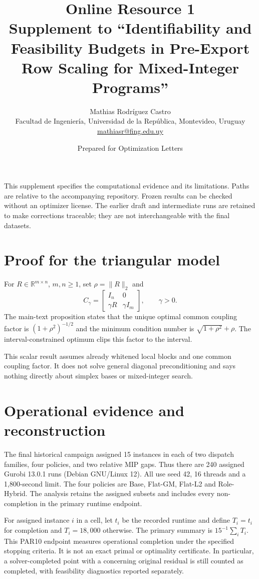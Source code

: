 \documentclass[11pt]{article}
\title{Online Resource 1\\\large Supplement to ``Identifiability and Feasibility Budgets in Pre-Export Row Scaling for Mixed-Integer Programs''}
\author{Mathias Rodr\'iguez Castro\\\small Facultad de Ingenier\'ia, Universidad de la Rep\'ublica, Montevideo, Uruguay\\\small\href{mailto:mathiasr@fing.edu.uy}{mathiasr@fing.edu.uy}}
\date{Prepared for Optimization Letters}
\begin{document}
\maketitle
This supplement specifies the computational evidence and its limitations. Paths are
relative to the accompanying repository. Frozen results can be checked without an
optimizer license. The earlier draft and intermediate runs are retained to make
corrections traceable; they are not interchangeable with the final datasets.

\section{Proof for the triangular model}
For $R\in\mathbb R^{m\times n}$, $m,n\ge1$, set $\rho=\|R\|_2$ and
\[
 C_\gamma=\begin{bmatrix}I_n&0\\\gamma R&\gamma I_m\end{bmatrix},\qquad \gamma>0.
\]
The main-text proposition states that the unique optimal common coupling factor is
$(1+\rho^2)^{-1/2}$ and the minimum condition number is $\sqrt{1+\rho^2}+\rho$.
The interval-constrained optimum clips this factor to the interval.

This scalar result assumes already whitened local blocks and one common coupling
factor. It does not solve general diagonal preconditioning and says nothing directly
about simplex bases or mixed-integer search.

\section{Operational evidence and reconstruction}
The final historical campaign assigned 15 instances in each of two dispatch families,
four policies, and two relative MIP gaps. Thus there are 240 assigned Gurobi 13.0.1 runs (Debian GNU/Linux 12).
All use seed 42, 16 threads and a 1,800-second limit. The four policies are Base,
Flat-GM, Flat-L2 and Role-Hybrid. The analysis retains the assigned subsets and
includes every non-completion in the primary runtime endpoint.

For assigned instance $i$ in a cell, let $t_i$ be the recorded runtime and define
$T_i=t_i$ for completion and $T_i=18{,}000$ otherwise. The primary summary is
$15^{-1}\sum_i T_i$. This PAR10 endpoint measures operational completion under
the specified stopping criteria. It is not an exact primal or optimality certificate.
In particular, a solver-completed point with a concerning original residual is still
counted as completed, with feasibility diagnostics reported separately.
\end{document}
